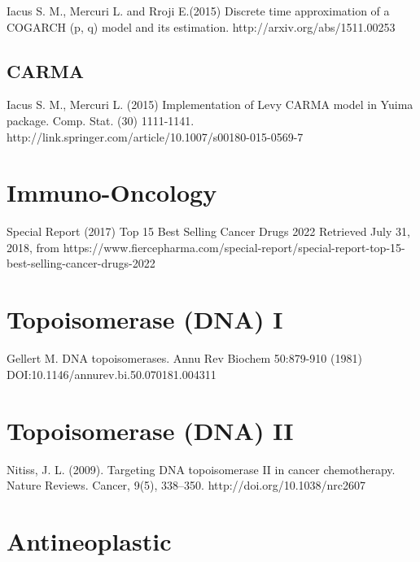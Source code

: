 \begin{thebibliography}{00}
Iacus S. M., Mercuri L. and Rroji E.(2015) 
\newblock Discrete time approximation of a COGARCH (p, q) model and its estimation. 
\newblock http://arxiv.org/abs/1511.00253

\subsection{CARMA}

Iacus S. M., Mercuri L. (2015) 
\newblock Implementation of Levy CARMA model in Yuima package. Comp. Stat. (30) 1111-1141. 
\newblock http://link.springer.com/article/10.1007/s00180-015-0569-7
\section{Immuno-Oncology}

Special Report (2017)
\newblock Top 15 Best Selling Cancer Drugs 2022
\newblock Retrieved July 31, 2018, from https://www.fiercepharma.com/special-report/special-report-top-15-best-selling-cancer-drugs-2022

\section{Topoisomerase (DNA) I}

Gellert M.
\newblock DNA topoisomerases.
\newblock Annu Rev Biochem 50:879-910 (1981) DOI:10.1146/annurev.bi.50.070181.004311

\section{Topoisomerase (DNA) II}

Nitiss, J. L. (2009). 
\newblock Targeting DNA topoisomerase II in cancer chemotherapy. Nature Reviews. 
\newblock Cancer, 9(5), 338–350. http://doi.org/10.1038/nrc2607
\section{Antineoplastic}


\end{thebibliography}
